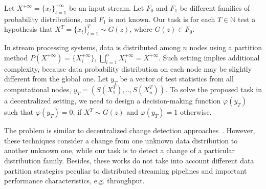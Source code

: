 \label {fs-short-model}

Let $X^{+\infty}=\{x_t\}_{t=1}^{+\infty}$ be an input stream. Let $F_0$ and $F_1$ be different families of probability distributions, and $F_1$ is not known. Our task is for each $T\in \mathbb{N}$ test a hypothesis that $X^T=\{x_t\}_{t=1}^{T} \sim G(z)$, where $G(z) \in F_0$.

In stream processing systems, data is distributed among $n$ nodes using a partition method $P(X^{+\infty})=\{X_i^{+\infty}\}$, $\bigsqcup_{i=1}^n X_i^{+\infty}=X^{+\infty}$. Such setting implies additional complexity, because data probability distribution on each node may be slightly different from the global one. Let $y_T$ be a vector of test statistics from all computational nodes,  $y_T = (S(X_1^T),..,S(X_n^T))$. To solve the proposed task in a decentralized setting, we need to design a decision-making function $\varphi(y_T)$ such that $\varphi(y_T) = 0$, if $X^T \sim G(z)$  and $\varphi(y_T) = 1$ otherwise.

The problem is similar to decentralized change detection approaches~\cite{tartakovsky2008asymptotically, tran2014change}. However, these techniques consider a change from one unknown data distribution to another unknown one, while our task is to detect a change of a particular distribution family. Besides, these works do not take into account different data partition strategies peculiar to distributed streaming pipelines and important performance characteristics, e.g. throughput.